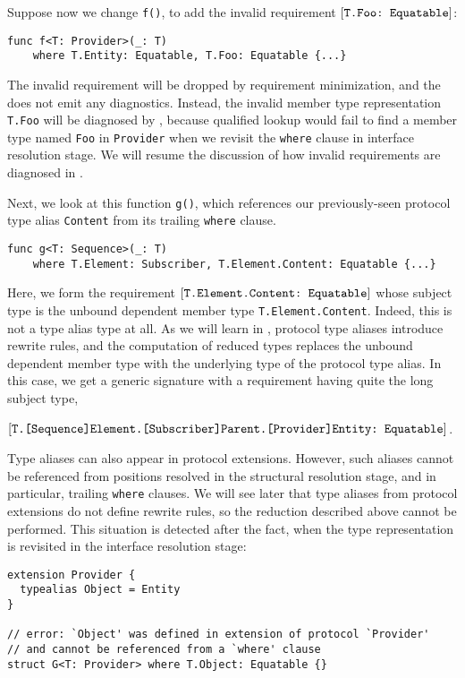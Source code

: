 \documentclass[../generics]{subfiles}
\begin{document}
Suppose now we change \texttt{f()}, to add the invalid requirement $[\texttt{T.Foo:~Equatable}]$:
\begin{Verbatim}
func f<T: Provider>(_: T)
    where T.Entity: Equatable, T.Foo: Equatable {...}
\end{Verbatim}
The invalid requirement will be dropped by requirement minimization, and the  does not emit any diagnostics. Instead, the invalid member type representation \texttt{T.Foo} will be diagnosed by , because qualified lookup would fail to find a member type named \texttt{Foo} in \texttt{Provider} when we revisit the \texttt{where} clause in interface resolution stage.  We will resume the discussion of how invalid requirements are diagnosed in .

\smallskip

Next, we look at this function \texttt{g()}, which references our previously-seen protocol type alias \texttt{Content} from its trailing \texttt{where} clause.
\begin{Verbatim}
func g<T: Sequence>(_: T)
    where T.Element: Subscriber, T.Element.Content: Equatable {...}
\end{Verbatim}
Here, we form the requirement $[\texttt{T.Element.Content:~Equatable}]$ whose subject type is the unbound dependent member type \texttt{T.Element.Content}. Indeed, this is not a type alias type at all. As we will learn in , protocol type aliases introduce rewrite rules, and the computation of reduced types replaces the unbound dependent member type with the underlying type of the protocol type alias. In this case, we get a generic signature with a requirement having quite the long subject type,
\begin{center}
$[\texttt{T.[Sequence]Element.[Subscriber]Parent.[Provider]Entity:~Equatable}]$.
\end{center}

Type aliases can also appear in protocol extensions. However, such aliases cannot be referenced from positions resolved in the structural resolution stage, and in particular, trailing \texttt{where} clauses. We will see later that type aliases from protocol extensions do not define rewrite rules, so the reduction described above cannot be performed. This situation is detected after the fact, when the type representation is revisited in the interface resolution stage:
\begin{Verbatim}
extension Provider {
  typealias Object = Entity
}

// error: `Object' was defined in extension of protocol `Provider'
// and cannot be referenced from a `where' clause
struct G<T: Provider> where T.Object: Equatable {}
\end{Verbatim}
\end{document}

